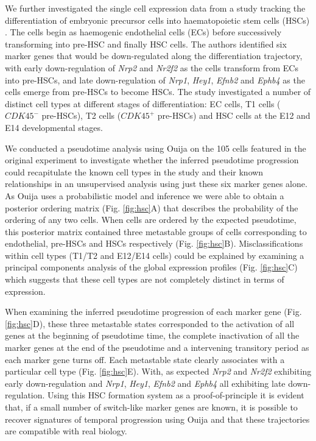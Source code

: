 We further investigated the single cell expression data from a study tracking the differentiation of embryonic precursor cells into haematopoietic stem cells (HSCs) \cite{zhou2016tracing}. The cells begin as haemogenic endothelial cells (ECs) before successively transforming  into pre-HSC and finally HSC cells. The authors identified six marker genes that would be down-regulated along the differentiation trajectory, with early down-regulation of \emph{Nrp2} and \emph{Nr2f2} as the cells transform from ECs into pre-HSCs, and late down-regulation of \emph{Nrp1}, \emph{Hey1}, \emph{Efnb2} and \emph{Ephb4} as the cells emerge from pre-HSCs to become HSCs. The study investigated a number of distinct cell types at different stages of differentiation: EC cells, T1 cells ($CDK45^-$ pre-HSCs), T2 cells ($CDK45^+$ pre-HSCs) and HSC cells at the E12 and E14 developmental stages.

We conducted a pseudotime analysis using Ouija on the 105 cells featured in the original experiment to investigate whether the inferred pseudotime progression could recapitulate the known cell types in the study and their known relationships in an unsupervised analysis using just these six marker genes alone. As Ouija uses a probabilistic model and inference we were able to obtain a posterior ordering matrix (Fig. \ref{fig:hsc}A) that describes the probability of the ordering of any two cells. When cells are ordered by the expected pseudotime, this posterior matrix contained three metastable groups of cells corresponding to endothelial, pre-HSCs and HSCs respectively (Fig. \ref{fig:hsc}B). Misclassifications within cell types (T1/T2 and E12/E14 cells) could be explained by examining a principal components analysis of the global expression profiles (Fig. \ref{fig:hsc}C) which suggests that these cell types are not completely distinct in terms of expression.

When examining the inferred pseudotime progression of each marker gene (Fig. \ref{fig:hsc}D), these three metastable states corresponded to the activation of all genes at the beginning of pseudotime time, the complete inactivation of all the marker genes at the end of the pseudotime and a intervening transitory period as each marker gene turns off. Each metastable state clearly associates with a particular cell type (Fig. \ref{fig:hsc}E). With, as expected \emph{Nrp2} and \emph{Nr2f2} exhibiting early down-regulation and \emph{Nrp1}, \emph{Hey1}, \emph{Efnb2} and \emph{Ephb4} all exhibiting late down-regulation. Using this HSC formation system as a proof-of-principle it is evident that, if a small number of switch-like marker genes are known, it is possible to recover signatures of temporal progression using Ouija and that these trajectories are compatible with real biology.

